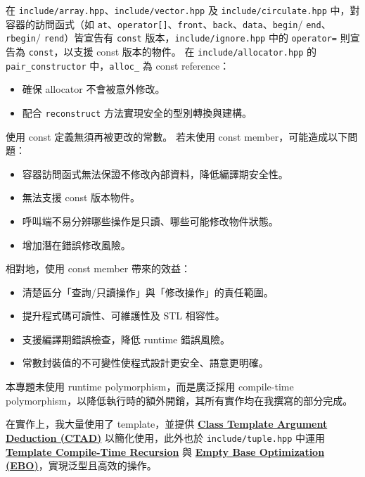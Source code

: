 \documentclass[a4paper,12pt]{article}
\begin{document}
在 \verb|include/array.hpp|、\verb|include/vector.hpp| 及 \verb|include/circulate.hpp| 中，對容器的訪問函式（如 \verb|at|、\verb|operator[]|、\verb|front|、\verb|back|、\verb|data|、\verb|begin|/ \verb|end|、\verb|rbegin|/ \verb|rend|）皆宣告有 \verb|const| 版本，\verb|include/ignore.hpp| 中的 \verb|operator=| 則宣告為 \verb|const|，以支援 const 版本的物件。
在 \verb|include/allocator.hpp| 的 \verb|pair_constructor| 中，\verb|alloc_| 為 const reference：
\begin{itemize}
  \item 確保 allocator 不會被意外修改。
  \item 配合 \verb|reconstruct| 方法實現安全的型別轉換與建構。
\end{itemize}
使用 const 定義無須再被更改的常數。
若未使用 const member，可能造成以下問題：
\begin{itemize}
\item 容器訪問函式無法保證不修改內部資料，降低編譯期安全性。
\item 無法支援 const 版本物件。
\item 呼叫端不易分辨哪些操作是只讀、哪些可能修改物件狀態。
\item 增加潛在錯誤修改風險。
\end{itemize}
相對地，使用 const member 帶來的效益：
\begin{itemize}
\item 清楚區分「查詢/只讀操作」與「修改操作」的責任範圍。
\item 提升程式碼可讀性、可維護性及 STL 相容性。
\item 支援編譯期錯誤檢查，降低 runtime 錯誤風險。
\item 常數封裝值的不可變性使程式設計更安全、語意更明確。
\end{itemize}
本專題未使用 runtime polymorphism，而是廣泛採用 compile-time polymorphism，以降低執行時的額外開銷，其所有實作均在我撰寫的部分完成。

在實作上，我大量使用了 template，並提供 \hyperref[ctad]{\textbf{Class Template Argument Deduction (CTAD)}} 以簡化使用，此外也於 \verb|include/tuple.hpp| 中運用 \hyperref[recursion]{\textbf{Template Compile-Time Recursion}} 與 \hyperref[ebo]{\textbf{Empty Base Optimization (EBO)}}，實現泛型且高效的操作。
\end{document}
